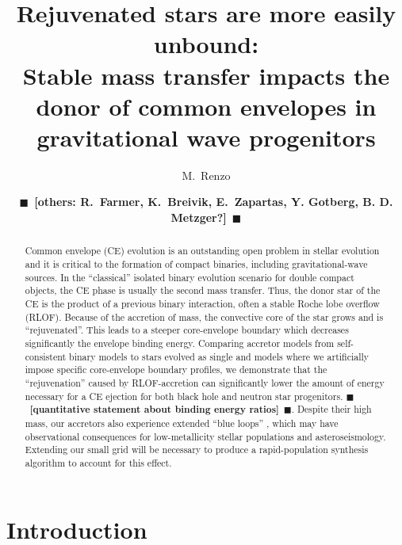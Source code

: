\documentclass[twocolumn,twocolappendix,trackchanges]{aastex63}
\newcommand{\todo}[1]{{\large $\blacksquare$~\textbf{\color{red}[#1]}}~$\blacksquare$}
\begin{document}
\graphicspath{{./figures/}}

\title{Rejuvenated stars are more easily unbound:\\ Stable
  mass transfer impacts the donor of common envelopes  in gravitational wave progenitors}

\author[0000-0002-6718-9472]{M.~Renzo}

\author{\todo{others: R.~Farmer, K.~Breivik, E.~Zapartas, Y. Gotberg,
    B. D. Metzger?}}


\begin{abstract}
  Common envelope (CE) evolution is an outstanding open problem in
  stellar evolution and it is critical to the formation of compact
  binaries, including gravitational-wave sources. In the ``classical''
  isolated binary evolution scenario for double compact objects, the
  CE phase is usually the second mass transfer. Thus, the donor star
  of the CE is the product of a previous binary interaction, often a
  stable Roche lobe overflow (RLOF). Because of the accretion of mass,
  the convective core of the star grows and is ``rejuvenated''. This
  leads to a steeper core-envelope boundary which decreases
  significantly the envelope binding energy. Comparing accretor models
  from self-consistent binary models to stars evolved as single and
  models where we artificially impose specific core-envelope boundary
  profiles, we demonstrate that the ``rejuvenation'' caused by
  RLOF-accretion can significantly lower the amount of energy necessary
  for a CE ejection for both black hole and neutron star progenitors.
  \todo{quantitative statement about binding energy ratios}.
  Despite their high mass, our accretors also experience extended
  ``blue loops'' , which may have observational consequences for
  low-metallicity stellar populations and asteroseismology. Extending
  our small grid will be necessary to produce a rapid-population
  synthesis algorithm to account for this effect.
\end{abstract}


\section{Introduction}
\label{sec:intro}
\end{document}
